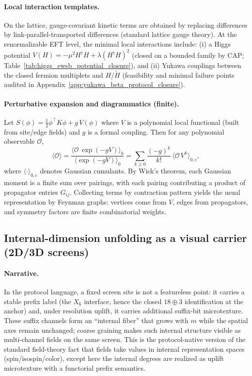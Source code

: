 \paragraph{Local interaction templates.}
\InterfaceTag On the lattice, gauge-covariant kinetic terms are obtained by replacing differences by link-parallel-transported differences (standard lattice gauge theory).
At the renormalizable EFT level, the minimal local interactions include:
(i) a Higgs potential $V(H)=-\mu^2 H^\dagger H+\lambda(H^\dagger H)^2$ (closed on a bounded family by CAP; Table~\ref{tab:higgs_ewsb_potential_closure}),
and (ii) Yukawa couplings between the closed fermion multiplets and $H$/$\widetilde H$ (feasibility and minimal failure points audited in Appendix~\ref{app:yukawa_beta_protocol_closure}).

\paragraph{Perturbative expansion and diagrammatics (finite).}
\MathTag Let $S(\phi)=\tfrac12\phi^\top K\phi + g\,V(\phi)$ where $V$ is a polynomial local functional (built from site/edge fields) and $g$ is a formal coupling.
Then for any polynomial observable $\mathcal{O}$,
\[
\langle \mathcal{O}\rangle
=\frac{\langle \mathcal{O}\,\exp(-gV)\rangle_0}{\langle \exp(-gV)\rangle_0}
=\sum_{k\ge 0}\frac{(-g)^k}{k!}\,\langle \mathcal{O}\,V^k\rangle_{0,\mathrm{c}},
\]
where $\langle\cdot\rangle_{0,\mathrm{c}}$ denotes Gaussian cumulants.
By Wick's theorem, each Gaussian moment is a finite sum over pairings, with each pairing contributing a product of propagator entries $G_{ij}$.
Collecting terms by contraction pattern yields the usual representation by Feynman graphs: vertices come from $V$, edges from propagators, and symmetry factors are finite combinatorial weights.

\subsection{Internal-dimension unfolding as a visual carrier (2D/3D screens)}
\label{subsec:internal_dimension_unfolding_visual}

\paragraph{Narrative.}
\InterfaceTag In the protocol language, a fixed screen site is not a featureless point: it carries a stable prefix label (the $X_6$ interface, hence the closed $18\oplus 3$ identification at the anchor) and, under resolution uplift, it carries additional suffix-bit microtexture.
These suffix channels form an ``internal fiber'' that grows with $m$ while the spatial axes remain unchanged; coarse graining makes such internal structure visible as multi-channel fields on the same screen.
This is the protocol-native version of the standard field-theory fact that fields take values in internal representation spaces (spin/isospin/color), except here the internal degrees are realized as uplift microtexture with a functorial prefix semantics.

